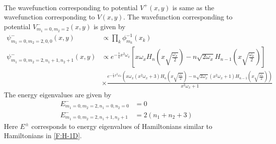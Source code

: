 \documentclass[12pt]{article}
\numberwithin{equation}{section} %
\begin{document}
{\begin{align*}
\end{align*}
The wavefunction corresponding to potential $V^+(x,y)$ is same as the wavefunction corresponding to $V(x,y)$. The wavefunction corresponding to potential $V^-_{m_1=0,m_2=2}(x,y)$ is given by
\begin{align*}
  \psi^-_{m_1=0,m_2=2,0,0}(x,y)&\propto \prod_{k}\phi_{m_k}^{-1}(x_k)\\
  \psi^-_{m_1=0,m_2=2,n_1+1,n_2+1}(x,y)&\propto e^{-\frac{1}{4} x^2 \omega_x} \left[x \omega_x H_n\left(x\sqrt{\frac{\omega_x}{2}}\right) - n \sqrt{2\omega_x} H_{n-1}\left(x\sqrt{\frac{\omega_x}{2}}\right)\right]\\
  &\times \frac{e^{-\frac{1}{4} x^2 \omega_x} \left(x \omega_x \left(x^2 \omega_x+3\right) H_n\left(x\sqrt{\frac{\omega_x}{2}}\right)- n \sqrt{2\omega_x} \left(x^2 \omega_x+1\right) H_{n-1}\left(x\sqrt{\frac{\omega_x}{2}}\right)\right)}{x^2 \omega_x+1}
\end{align*}
The energy eigenvalues are given by 
\begin{align*}
  E^-_{m_1=0,m_2=2,n_1=0,n_2=0}&=0\\
  E^-_{m_1=0,m_2=2,n_1+1,n_2+1}&= 2(n_1+n_2+3)
\end{align*}
Here $E^\pm$ corresponds to energy eigenvalues of Hamiltonians similar to Hamiltonians in \ref{F:H-1D}.
}
\end{document}
